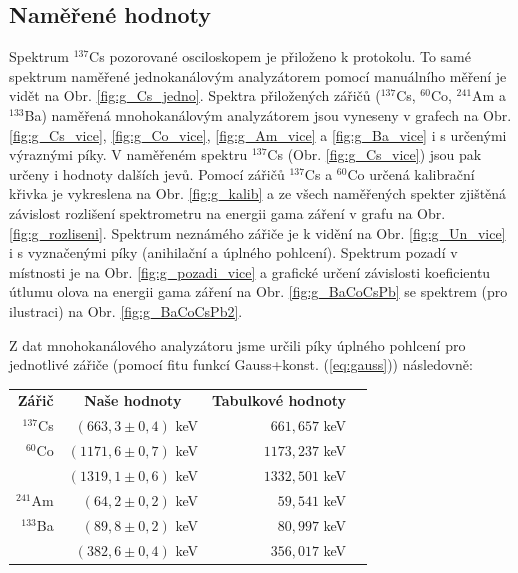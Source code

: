 \documentclass[english]{article}
\begin{document}
	\subsection{Naměřené hodnoty}
					Spektrum $^{137}$Cs pozorované osciloskopem je přiloženo k protokolu. To samé spektrum naměřené jednokanálovým analyzátorem pomocí manuálního měření je vidět na Obr. \ref{fig:g_Cs_jedno}. Spektra přiložených zářičů ($^{137}$Cs, $^{60}$Co, $^{241}$Am a $^{133}$Ba) naměřená mnohokanálovým analyzátorem jsou vyneseny v grafech na Obr. \ref{fig:g_Cs_vice}, \ref{fig:g_Co_vice}, \ref{fig:g_Am_vice} a \ref{fig:g_Ba_vice} i s určenými výraznými píky. V naměřeném spektru $^{137}$Cs (Obr. \ref{fig:g_Cs_vice}) jsou pak určeny i hodnoty dalších jevů. Pomocí zářičů $^{137}$Cs a $^{60}$Co určená kalibrační křivka je vykreslena na Obr. \ref{fig:g_kalib} a ze všech naměřených spekter zjištěná závislost rozlišení spektrometru na energii gama záření v grafu na Obr. \ref{fig:g_rozliseni}. Spektrum neznámého zářiče je k vidění na Obr. \ref{fig:g_Un_vice} i s vyznačenými píky (anihilační a úplného pohlcení). Spektrum pozadí v místnosti je na Obr. \ref{fig:g_pozadi_vice} a grafické určení závislosti koeficientu útlumu olova na energii gama záření na Obr. \ref{fig:g_BaCoCsPb} se spektrem (pro ilustraci) na Obr. \ref{fig:g_BaCoCsPb2}.
					
					Z dat  mnohokanálového analyzátoru jsme určili píky úplného pohlcení pro jednotlivé zářiče (pomocí fitu funkcí Gauss+konst. (\ref{eq:gauss})) následovně:
					\begin{center}
					\begin{tabular}{rrrr}
							\textbf{Zářič} & \multicolumn{1}{c}{\textbf{Naše hodnoty}} & \multicolumn{1}{c}{\textbf{Tabulkové hodnoty \cite{bib:net}}}\\
					        $^{137}$Cs & $(663,3 \pm 0,4)$ keV &  $661,657$ keV \\
					        $^{60}$Co & $(1171,6 \pm 0,7)$ keV &  $1173,237$ keV  \\
					                             & $(1319,1 \pm 0,6)$ keV & $1332,501$ keV\\
					        $^{241}$Am & $(64,2 \pm 0,2)$ keV & $59,541$ keV\\					        
					        $^{133}$Ba & $(89,8 \pm 0,2)$ keV & $80,997$ keV \\
					                              & $(382,6 \pm 0,4)$ keV & $356,017$ keV\\
					\end{tabular}
					\end{center}
					\vspace{0.4cm}
					
\end{document}

